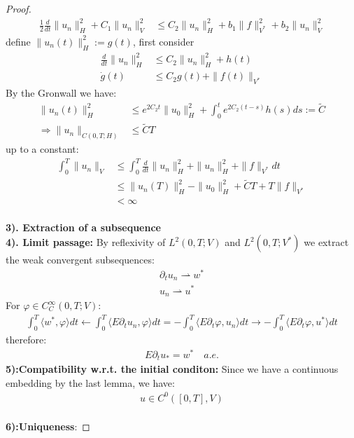 \documentclass[a4paper,11pt,oneside,fleqn]{book}
\theoremstyle{definition}
\theoremstyle{remark}
\begin{document}
\begin{proof}
\begin{align*}
 	\frac{1}{2}\frac{d}{dt} \|u_n\|_H^2 + C_1 \|u_n\|_V^2 &\le C_2 \|u_n\|_H^2 + b_1 \|f\|_{V^*}^2 + b_2 \|u_n\|_V^2
 \end{align*}
 define $\|u_n(t)\|_H^2 := g(t)$,  first consider
 \begin{align*}
 	 \frac{d}{dt} \|u_n\|_H^2 &\le C_2 \|u_n\|_H^2 + h(t)  \\ 
 	\dot{g}(t)  &\le C_2g(t) + \|f(t)\|_{V^*}
 \end{align*}
 By the Gronwall we have:
 \begin{align*}
 	\|u_n(t)\|_H^2 &\le e^{2C_2 t} \|u_0\|_H^2 + \int_0^t e^{2 C_2(t - s)}h(s)ds := \tilde{C}\\
 	\Rightarrow \|u_n\|_{C(0, T; H)} &\le \tilde{C}T
 \end{align*}
 up to a constant:
 \begin{align*}
 	\int_0^T \|u_n\|_V &\le \int_0^T \frac{d}{dt}\|u_n\|_H^2 + \|u_n\|_H^2 + \|f\|_{V^*} dt \\
 	&\le \|u_n(T)\|_H^2 - \|u_0\|_H^2 + \tilde{C}T + T\|f\|_{V^*}\\
 	&< \infty
 \end{align*}
 \\
 \textbf{3). Extraction of a subsequence}
 \\
 \textbf{4). Limit passage:}
 By reflexivity of $L^2(0, T;V)$ and $L^2(0, T; V^*)$ we extract the weak convergent subsequences:
 \begin{align*}
 \partial_t u_n \rightharpoonup w^*\\
 	u_n \rightharpoonup u^*
 \end{align*}
 For $\varphi \in C_C^\infty(0, T;V)$:
 \begin{align*}
 	\int_0^T \langle w^*, \varphi \rangle dt 
 	\leftarrow
 	\int_0^T \langle E\partial_t u_n, \varphi \rangle dt = -\int_0^T \langle E\partial_t \varphi, u_n \rangle dt \rightarrow -\int_0^T \langle E\partial_t\varphi, u^* \rangle dt
 \end{align*}
 therefore:
 \begin{align*}
 	E\partial_t u_* = w^* \quad a.e. 
 \end{align*}
 \textbf{5):Compatibility w.r.t. the initial conditon: } Since we have a continuous embedding by the last lemma, we have:
 \begin{align*}
 	u \in C^0([0, T], V)
 \end{align*}
 \quad\\
 \textbf{6):Uniqueness}:	
 \end{proof}
 
\end{document}
